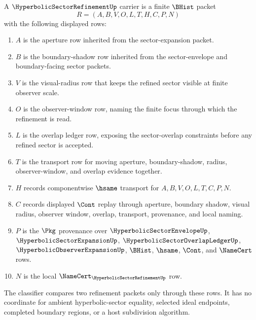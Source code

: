 \begin{definition}
\label{def:hyperbolic-sector-refinement-carrier}
A $\HyperbolicSectorRefinementUp$ carrier is a finite $\BHist$ packet
$$
R=(A,B,V,O,L,T,H,C,P,N)
$$
with the following displayed rows:
\begin{enumerate}
\item $A$ is the aperture row inherited from the sector-expansion packet.
\item $B$ is the boundary-shadow row inherited from the sector-envelope and boundary-facing sector packets.
\item $V$ is the visual-radius row that keeps the refined sector visible at finite observer scale.
\item $O$ is the observer-window row, naming the finite focus through which the refinement is read.
\item $L$ is the overlap ledger row, exposing the sector-overlap constraints before any refined sector is accepted.
\item $T$ is the transport row for moving aperture, boundary-shadow, radius, observer-window, and overlap evidence together.
\item $H$ records componentwise $\hsame$ transport for $A,B,V,O,L,T,C,P,N$.
\item $C$ records displayed $\Cont$ replay through aperture, boundary shadow, visual radius, observer window, overlap, transport, provenance, and local naming.
\item $P$ is the $\Pkg$ provenance over $\HyperbolicSectorEnvelopeUp$, $\HyperbolicSectorExpansionUp$, $\HyperbolicSectorOverlapLedgerUp$, $\HyperbolicObserverExpansionUp$, $\BHist$, $\hsame$, $\Cont$, and $\NameCert$ rows.
\item $N$ is the local $\NameCert_{\HyperbolicSectorRefinementUp}$ row.
\end{enumerate}
The classifier compares two refinement packets only through these rows. It has no coordinate for ambient hyperbolic-sector equality, selected ideal endpoints, completed boundary regions, or a host subdivision algorithm.
\end{definition}

